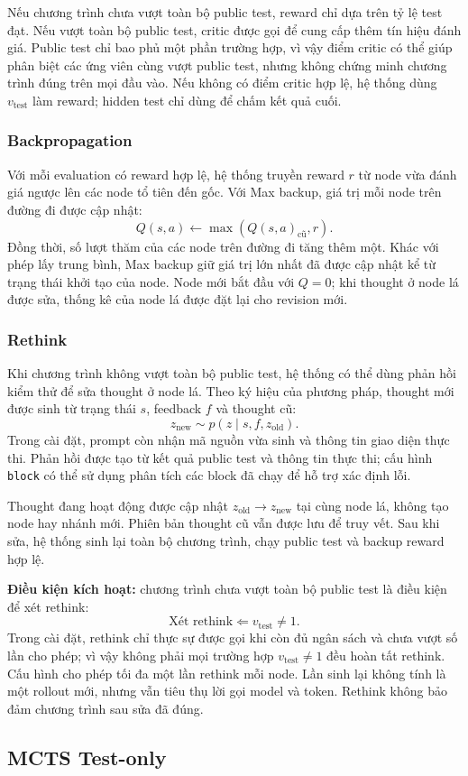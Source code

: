 Nếu chương trình chưa vượt toàn bộ public test, reward chỉ dựa trên tỷ lệ test đạt. Nếu vượt toàn bộ public test, critic được gọi để cung cấp thêm tín hiệu đánh giá. Public test chỉ bao phủ một phần trường hợp, vì vậy điểm critic có thể giúp phân biệt các ứng viên cùng vượt public test, nhưng không chứng minh chương trình đúng trên mọi đầu vào. Nếu không có điểm critic hợp lệ, hệ thống dùng $v_{\mathrm{test}}$ làm reward; hidden test chỉ dùng để chấm kết quả cuối.

\subsubsection{Backpropagation}
Với mỗi evaluation có reward hợp lệ, hệ thống truyền reward $r$ từ node vừa đánh giá ngược lên các node tổ tiên đến gốc. Với Max backup, giá trị mỗi node trên đường đi được cập nhật:
\[
  Q(s,a)\leftarrow\max\!\left(Q(s,a)_{\mathrm{cũ}},r\right).
\]
Đồng thời, số lượt thăm của các node trên đường đi tăng thêm một. Khác với phép lấy trung bình, Max backup giữ giá trị lớn nhất đã được cập nhật kể từ trạng thái khởi tạo của node. Node mới bắt đầu với $Q=0$; khi thought ở node lá được sửa, thống kê của node lá được đặt lại cho revision mới.

\subsubsection{Rethink}
Khi chương trình không vượt toàn bộ public test, hệ thống có thể dùng phản hồi kiểm thử để sửa thought ở node lá. Theo ký hiệu của phương pháp, thought mới được sinh từ trạng thái $s$, feedback $f$ và thought cũ:
\[
  z_{\mathrm{new}}\sim p\!\left(z\mid s,f,z_{\mathrm{old}}\right).
\]
Trong cài đặt, prompt còn nhận mã nguồn vừa sinh và thông tin giao diện thực thi. Phản hồi được tạo từ kết quả public test và thông tin thực thi; cấu hình \texttt{block} có thể sử dụng phân tích các block đã chạy để hỗ trợ xác định lỗi.

Thought đang hoạt động được cập nhật $z_{\mathrm{old}}\rightarrow z_{\mathrm{new}}$ tại cùng node lá, không tạo node hay nhánh mới. Phiên bản thought cũ vẫn được lưu để truy vết. Sau khi sửa, hệ thống sinh lại toàn bộ chương trình, chạy public test và backup reward hợp lệ.

\begin{minipage}{\linewidth}
\textbf{Điều kiện kích hoạt:} chương trình chưa vượt toàn bộ public test là điều kiện để xét rethink:
\[
  \text{Xét rethink} \Longleftarrow v_{\mathrm{test}}\ne 1.
\]
Trong cài đặt, rethink chỉ thực sự được gọi khi còn đủ ngân sách và chưa vượt số lần cho phép; vì vậy không phải mọi trường hợp $v_{\mathrm{test}}\ne1$ đều hoàn tất rethink. Cấu hình cho phép tối đa một lần rethink mỗi node. Lần sinh lại không tính là một rollout mới, nhưng vẫn tiêu thụ lời gọi model và token. Rethink không bảo đảm chương trình sau sửa đã đúng.
\end{minipage}

\subsection{MCTS Test-only}
